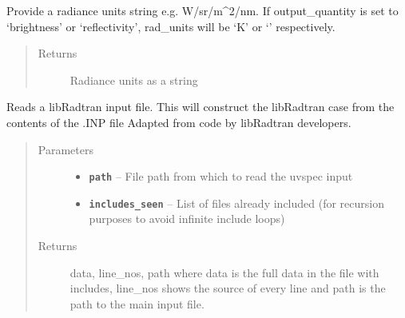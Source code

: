 \documentclass[a4paper,10pt,english]{sphinxmanual}
\begin{document}
\begin{fulllineitems}

\begin{fulllineitems}
\label{packages:librad.Case.rad_units_str}
Provide a radiance units string e.g. W/sr/m\textasciicircum{}2/nm.
If output\_quantity is set to `brightness' or `reflectivity', rad\_units will be `K' or `' respectively.
\begin{quote}\begin{description}
\item[{Returns}] \leavevmode
Radiance units as a string

\end{description}\end{quote}

\end{fulllineitems}


\begin{fulllineitems}
\label{packages:librad.Case.read}
Reads a libRadtran input file. This will construct the libRadtran case from the contents of the .INP file
Adapted from code by libRadtran developers.
\begin{quote}\begin{description}
\item[{Parameters}] \leavevmode\begin{itemize}
\item {} 
\textbf{\texttt{path}} -- File path from which to read the uvspec input

\item {} 
\textbf{\texttt{includes\_seen}} -- List of files already included (for recursion purposes to avoid infinite include loops)

\end{itemize}

\item[{Returns}] \leavevmode
data, line\_nos, path
where data is the full data in the file with includes, line\_nos shows the source of every line and
path is the path to the main input file.

\end{description}\end{quote}

\end{fulllineitems}


\end{fulllineitems}
\end{document}
